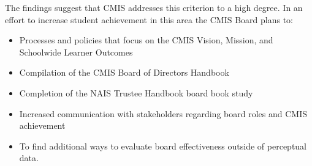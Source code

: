 \begin{findings}
The findings suggest that CMIS addresses this criterion to a high degree. In an effort to increase student achievement in this area the CMIS Board plans to:

\begin{itemize}
\item Processes and policies that focus on the CMIS Vision, Mission, and Schoolwide Learner Outcomes
\item Compilation of the CMIS Board of Directors Handbook
\item Completion of the NAIS Trustee Handbook board book study
\end{itemize}


\begin{itemize}
\item Increased communication with stakeholders regarding board roles and CMIS achievement
\end{itemize}


\begin{itemize}
\item To find additional ways to evaluate board effectiveness outside of perceptual data. 
\end{itemize}
\end{findings}
